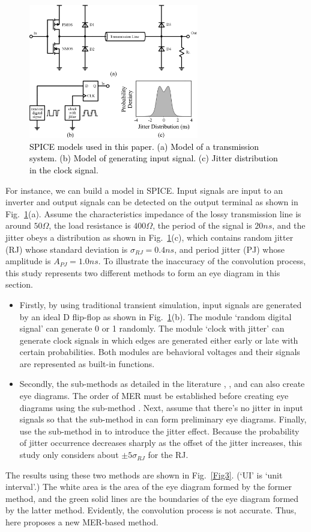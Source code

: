 \documentclass[conference]{IEEEtran}
\begin{document}
\begin{figure}[t]
\centerline{\includegraphics[width=210pt]{Fig2.png}}
\caption{\textcolor{black}{SPICE models used in this paper. (a) Model of a transmission system. (b) Model of generating input signal. (c) Jitter distribution in the clock signal. }}
\label{Fig2}
\end{figure}

\color{black}
For instance, we can build a model in SPICE. Input signals are input to an inverter and output signals can be detected on the output terminal as shown in Fig.~\ref{Fig2}(a). Assume the characteristics impedance of the lossy transmission line is around $50\Omega$, the load resistance is $400\Omega$, the period of the signal is $20ns$, and the jitter obeys a distribution as shown in Fig.~\ref{Fig2}(c), which contains random jitter (RJ) whose standard deviation is $\sigma_{RJ}=0.4ns$, and period jitter (PJ) whose amplitude is $A_{PJ}=1.0ns$. To illustrate the inaccuracy of the convolution process, this study represents two different methods to form an eye diagram in this section.
\begin{itemize}
\item Firstly, by using traditional transient simulation, input signals are generated by an ideal D flip-flop as shown in Fig.~\ref{Fig2}(b). The module `random digital signal' can generate 0 or 1 randomly. The module `clock with jitter' can generate clock signals in which edges are generated either early or late with certain probabilities. Both modules are behavioral voltages and their signals are represented as built-in functions.
\item Secondly, the sub-methods as detailed in the literature \cite{b9}, \cite{b3}, and \cite{b8} can also create eye diagrams. The order of MER must be established before creating eye diagrams using the sub-method \cite{b9}. Next, assume that there's no jitter in input signals so that the sub-method in \cite{b3} can form preliminary eye diagrams. Finally, use the sub-method in \cite{b8} to introduce the jitter effect. Because the probability of jitter occurrence decreases sharply as the offset of the jitter increases, this study only considers about $\pm5\sigma_{RJ}$ for the RJ.
\end{itemize}
The results using these two methods are shown in Fig.~\ref{Fig3}. (`UI' is `unit interval'.) The white area is the area of the eye diagram formed by the former method, and the green solid lines are the boundaries of the eye diagram formed by the latter method. Evidently,
\color{black}
the convolution process is not accurate. Thus, here proposes a new MER-based method.
\end{document}
